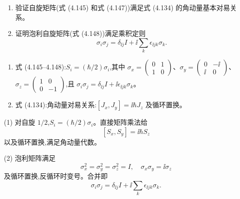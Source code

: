 \begin{question}
\begin{enumerate}
\item 验证自旋矩阵(式 (4.145) 和式 (4.147))满足式 (4.134) 的角动量基本对易关系。
\item 证明泡利自旋矩阵(式 (4.148))满足乘积定则
\[
\sigma_i\sigma_j=\delta_{\ii j}I+\ii\sum_k\epsilon_{\ii jk}\sigma_k.
\]
\end{enumerate}

\par\smallskip
{}
\begin{enumerate}[leftmargin=2.2em,itemsep=0.12em,topsep=0.12em,parsep=0pt]
\item 式 (4.145--4.148):$S_i=(\hbar/2)\sigma_i$,其中 $\sigma_x=\begin{pmatrix}0&1\\1&0\end{pmatrix}$、$\sigma_y=\begin{pmatrix}0&-\ii\\\ii&0\end{pmatrix}$、$\sigma_z=\begin{pmatrix}1&0\\0&-1\end{pmatrix}$,且 $\sigma_i\sigma_j=\delta_{\ii j}I+\ii\epsilon_{\ii jk}\sigma_k$。
\item 式 (4.134):角动量对易关系:$[J_x,J_y]=\ii\hbar J_z$ 及循环置换。
\end{enumerate}

\end{question}
\begin{solution}

(1) 对自旋 $1/2$,$S_i=(\hbar/2)\sigma_i$。直接矩阵乘法给
\[
[S_x,S_y]=\ii\hbar S_z
\]
以及循环置换,满足角动量代数。

(2) 泡利矩阵满足
\[
\sigma_x^2=\sigma_y^2=\sigma_z^2=I,
\quad \sigma_x\sigma_y=\ii\sigma_z
\]
及循环置换,反循环时变号。合并即
\[
\sigma_i\sigma_j=\delta_{\ii j}I+\ii\sum_k\epsilon_{\ii jk}\sigma_k.
\]

\end{solution}

